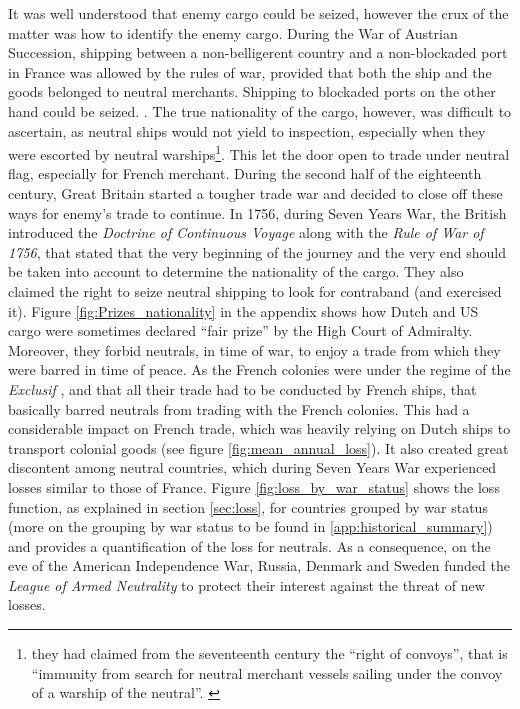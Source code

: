 \documentclass[12pt,a4paper,notitlepage,english]{article}
\begin{document}
It was well understood that enemy cargo could be seized, however the crux of the matter was how to identify the enemy cargo.
During the War of Austrian Succession, shipping between a non-belligerent country and a non-blockaded port in France was allowed by the rules of war, provided that both the ship and the goods belonged to neutral merchants. Shipping to blockaded ports on the other hand could be seized. \citep[p. 112]{Schnakenbourg2013}. The true nationality of the cargo, however, was difficult to ascertain, as neutral ships would not yield to inspection, especially when they were escorted by neutral warships\footnote{they had claimed from the seventeenth century the ``right of convoys'', that is ``immunity from search for neutral merchant vessels sailing under the convoy of a warship of the neutral''.  \citep{TheEditorsofEncyclopaediaBritannica2014}}. This let the door open to trade under neutral flag, especially for French merchant. 
During the second half of the eighteenth century, Great Britain started a tougher trade war and decided to close off these ways for enemy's trade to continue. 
In 1756, during Seven Years War, the British introduced the \textit{Doctrine of Continuous Voyage} along with the \textit{Rule of War of 1756}, that stated that the very beginning of the journey and the very end should be taken into account to determine the nationality of the cargo. They also claimed the right to seize neutral shipping to look for contraband (and exercised it). Figure \ref{fig:Prizes_nationality} in the appendix shows how Dutch and US cargo were sometimes declared ``fair prize'' by the High Court of Admiralty. Moreover, they forbid neutrals, in time of war, to enjoy a trade from which they were barred in time of peace. 
As the French colonies were under the regime of the \textit{Exclusif} \citep{Tarrade1972}, and that all their trade had to be conducted by French ships, that basically barred neutrals from trading with the French colonies.
This had a considerable impact on French trade, which was heavily relying on Dutch ships to transport colonial goods (see figure \ref{fig:mean_annual_loss}).
It also created great discontent among neutral countries, which during Seven Years War experienced losses similar to those of France. Figure \ref{fig:loss_by_war_status} shows the loss function, as explained in section \ref{sec:loss}, for countries grouped by war status (more on the grouping by war status to be found in \ref{app:historical_summary}) and provides a quantification of the loss for neutrals. As a consequence, on the eve of the American Independence War, Russia, Denmark and Sweden funded the \textit{League of Armed Neutrality} to protect their interest against the threat of new losses.
\end{document}
